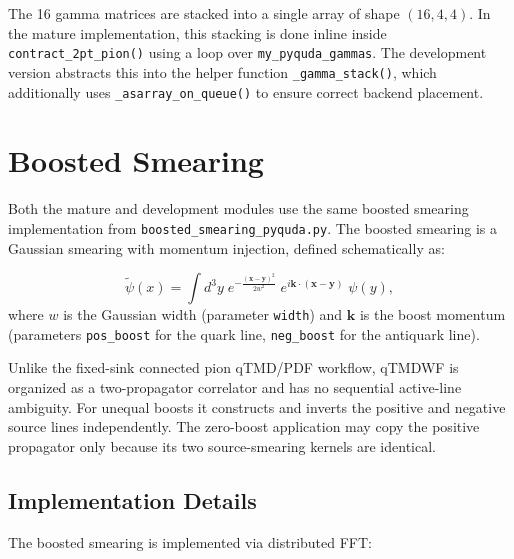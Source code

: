 \documentclass[11pt]{article}
\begin{document}
The 16 gamma matrices are stacked into a single array of shape $(16, 4, 4)$. In the mature implementation, this stacking is done inline inside \texttt{contract\_2pt\_pion()} using a loop over \texttt{my\_pyquda\_gammas}. The development version abstracts this into the helper function \texttt{\_gamma\_stack()}, which additionally uses \texttt{\_asarray\_on\_queue()} to ensure correct backend placement.

\section{Boosted Smearing}
\label{sec:smearing}

Both the mature and development modules use the same boosted smearing implementation from \texttt{boosted\_smearing\_pyquda.py}. The boosted smearing is a Gaussian smearing with momentum injection, defined schematically as:

\begin{equation}
    \tilde{\psi}(x) = \int d^3y \; e^{-\frac{(\mathbf{x} - \mathbf{y})^2}{2w^2}} \; e^{i \mathbf{k} \cdot (\mathbf{x} - \mathbf{y})} \; \psi(y),
\end{equation}
where $w$ is the Gaussian width (parameter \texttt{width}) and $\mathbf{k}$ is the boost momentum (parameters \texttt{pos\_boost} for the quark line, \texttt{neg\_boost} for the antiquark line).

Unlike the fixed-sink connected pion qTMD/PDF workflow, qTMDWF is organized as
a two-propagator correlator and has no sequential active-line ambiguity.  For
unequal boosts it constructs and inverts the positive and negative source
lines independently.  The zero-boost application may copy the positive
propagator only because its two source-smearing kernels are identical.

\subsection{Implementation Details}

The boosted smearing is implemented via distributed FFT:
\end{document}
